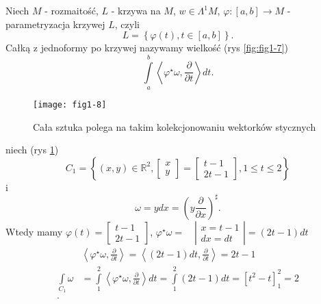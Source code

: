 \documentclass[../main.tex]{subfiles}
\begin{document}
\pagebreak
\begin{definicja}
    Niech $M$ - rozmaitość, $L$ - krzywa na $M$, $w\in \Lambda^1M$, $\varphi: [a,b] \to M$ - parametryzacja krzywej $L$, czyli
    \[
        L = \left\{ \varphi(t), t\in [a,b] \right\}
    .\]
Całką z jednoformy po krzywej nazywamy wielkość (rys \ref{fig:fig1-7})
\[
\int\limits_a^b \left<\varphi^\star \omega, \frac{\partial }{\partial t}  \right>dt
.\]
\end{definicja}
\begin{figure}[h]
    \centering
    \texttt{[image: fig1-8]}
    \caption{Cała sztuka polega na takim kolekcjonowaniu wektorków stycznych}
    \label{fig:fig1-8}
\end{figure}
\begin{przyklad}
    niech (rys \ref{fig:fig1-8})
 \[
     C_1 = \left\{ (x,y)\in \mathbb{R}^2, \begin{bmatrix} x\\y \end{bmatrix} = \begin{bmatrix} t-1\\2t-1 \end{bmatrix}, 1\le t\le 2 \right\}
\]
i
    \[
        \omega = ydx = \left( y \frac{\partial }{\partial x}  \right)^\sharp
    .\]
Wtedy mamy $\varphi(t) = \begin{bmatrix} t-1\\2t-1 \end{bmatrix} $, $\varphi^\star \omega =\quad \left| \begin{matrix}x=t-1\\dx = dt\end{matrix}\right| = (2t-1)dt$
    \begin{align*}
        &\left<\varphi^\star \omega, \frac{\partial }{\partial t}  \right> = \left<(2t-1)dt, \frac{\partial }{\partial t}  \right> = 2t-1\\
        \int\limits_{C_1}\omega &= \int\limits_1^2\left<\varphi^\star\omega, \frac{\partial }{\partial t}  \right>dt = \int\limits_1^2 (2t-1)dt = \left[ t^2 - t \right]_1^2 =  2\\
    .\end{align*}


\end{przyklad}
\end{document}
